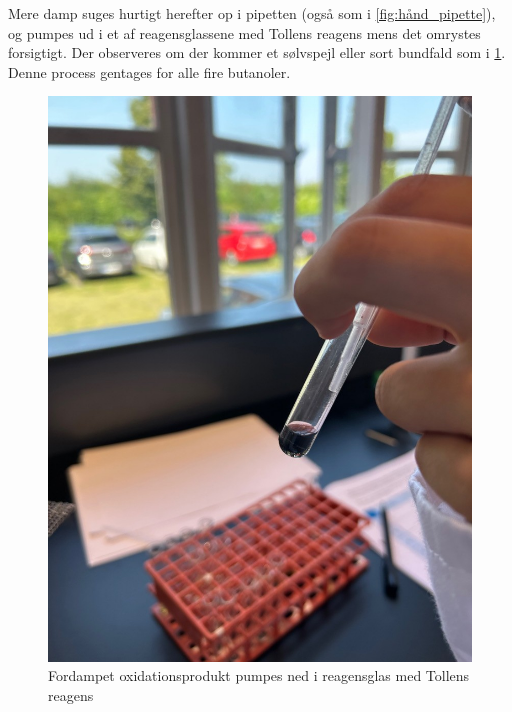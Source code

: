 \documentclass{report}
\begin{document}
Mere damp suges hurtigt herefter op i pipetten (også som i \cref{fig:hånd_pipette}), og pumpes ud i et af reagensglassene med Tollens reagens mens det omrystes forsigtigt.
Der observeres om der kommer et sølvspejl eller sort bundfald som i \cref{fig:sort_pipette}.
Denne process gentages for alle fire butanoler.
\begin{figure}[H]
\begin{center}
  \includegraphics[scale=0.5]{sort_pipette.jpg}
\end{center}
\caption{Fordampet oxidationsprodukt pumpes ned i reagensglas med Tollens reagens}
\label{fig:sort_pipette}
\end{figure}
\end{document}
